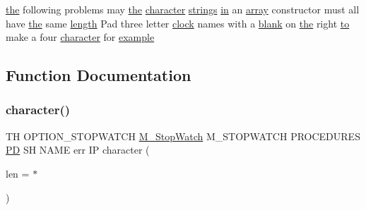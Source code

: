 \begin{DoxyCompactItemize}
\hyperlink{M__stopwatch_83_8txt_a0f266597de2e57eb3aa964927bb30e14}{the} following problems may \hyperlink{M__stopwatch_83_8txt_a0f266597de2e57eb3aa964927bb30e14}{the} \hyperlink{option__stopwatch_83_8txt_abd4b21fbbd175834027b5224bfe97e66}{character} \hyperlink{M__stopwatch_83_8txt_aa711ac7da2d78a086c6bb85bf7aa4f9f}{strings} \hyperlink{M__journal_83_8txt_afce72651d1eed785a2132bee863b2f38}{in} an \hyperlink{intro__blas1_83_8txt_a89db1945e1a335ab0184c6a097821e32}{array} constructor must all have \hyperlink{M__stopwatch_83_8txt_a0f266597de2e57eb3aa964927bb30e14}{the} same \hyperlink{M__stopwatch_83_8txt_a04ed5ef37abacfa36a856b5f30376485}{length} Pad three letter \hyperlink{stop__watch_83_8txt_a148c035b430d6edf5413dbd2704facfb}{clock} names with a \hyperlink{M__stopwatch_83_8txt_ab1e613d54e5499697dd1189104a9f678}{blank} on \hyperlink{M__stopwatch_83_8txt_a0f266597de2e57eb3aa964927bb30e14}{the} right \hyperlink{M__stopwatch_83_8txt_a97209fd3e34ef701c0a9734280779cbb}{to} make a four \hyperlink{option__stopwatch_83_8txt_abd4b21fbbd175834027b5224bfe97e66}{character} for \hyperlink{option__stopwatch_83_8txt_a234fb06c9989676e2603991316e7ddc3}{example}
\end{DoxyCompactItemize}


\subsection{Function Documentation}
\mbox{\label{option__stopwatch_83_8txt_abd4b21fbbd175834027b5224bfe97e66}} 
\subsubsection{\texorpdfstring{character()}{character()}}
{\footnotesize\ttfamily TH O\+P\+T\+I\+O\+N\+\_\+\+S\+T\+O\+P\+W\+A\+T\+CH \hyperlink{option__stopwatch_83_8txt_aa2011fc45a5e502e87ee50996a8a9305}{M\+\_\+\+Stop\+Watch} M\+\_\+\+S\+T\+O\+P\+W\+A\+T\+CH P\+R\+O\+C\+E\+D\+U\+R\+ES \hyperlink{what__overview_81_8txt_a85f26da5a4481fbdb0d9c79f2b94de3e}{PD} SH N\+A\+ME err IP character (\begin{DoxyParamCaption}\item[{len}]{ = {\ttfamily $\ast$} }\end{DoxyParamCaption})}

\mbox{\label{option__stopwatch_83_8txt_ab7c1e89ebaceed2bc514366bd08ed26b}} 
